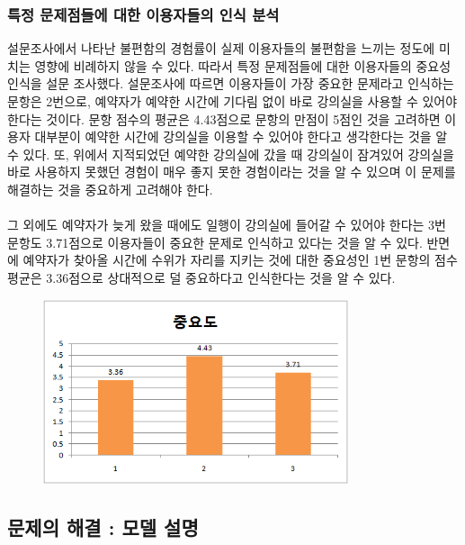 \documentclass[11pt,a4paper]{article}
\begin{document}
\subsubsection{특정 문제점들에 대한 이용자들의 인식 분석}
설문조사에서 나타난 불편함의 경험률이 실제 이용자들의 불편함을 느끼는 정도에 미치는 영향에 비례하지 않을 수 있다. 따라서 특정 문제점들에 대한 이용자들의 중요성 인식을 설문 조사했다. 설문조사에 따르면 이용자들이 가장 중요한 문제라고 인식하는 문항은 2번으로, 예약자가 예약한 시간에 기다림 없이 바로 강의실을 사용할 수 있어야 한다는 것이다. 문항 점수의 평균은 4.43점으로 문항의 만점이 5점인 것을 고려하면 이용자 대부분이 예약한 시간에 강의실을 이용할 수 있어야 한다고 생각한다는 것을 알 수 있다. 또, 위에서 지적되었던 예약한 강의실에 갔을 때 강의실이 잠겨있어 강의실을 바로 사용하지 못했던 경험이 매우 좋지 못한 경험이라는 것을 알 수 있으며 이 문제를 해결하는 것을 중요하게 고려해야 한다.
\\
\\
그 외에도 예약자가 늦게 왔을 때에도 일행이 강의실에 들어갈 수 있어야 한다는 3번 문항도 3.71점으로 이용자들이 중요한 문제로 인식하고 있다는 것을 알 수 있다. 반면에 예약자가 찾아올 시간에 수위가 자리를 지키는 것에 대한 중요성인 1번 문항의 점수 평균은 3.36점으로 상대적으로 덜 중요하다고 인식한다는 것을 알 수 있다.
\begin{figure}[H]
\includegraphics[width=0.8\textwidth]{4_1_4}
\centering
\end{figure}

\subsection{문제의 해결 : 모델 설명}
\end{document}
